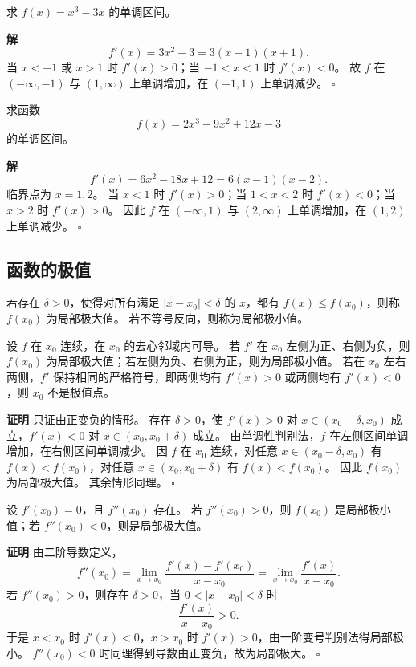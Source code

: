 \documentclass[fontset=fandol]{ctexart}
\newenvironment{proofdetail}{\par\noindent\textbf{证明}\quad}{\hfill$\square$\par\vspace{0.8em}}
\newenvironment{solution}{\par\noindent\textbf{解}\quad}{\hfill$\square$\par\vspace{0.8em}}
\begin{document}
\begin{example}[求单调区间]
求 $f(x)=x^3-3x$ 的单调区间。
\end{example}
\begin{solution}
\[
f'(x)=3x^2-3=3(x-1)(x+1).
\]
当 $x<-1$ 或 $x>1$ 时 $f'(x)>0$；当 $-1<x<1$ 时 $f'(x)<0$。 故 $f$ 在 $(-\infty,-1)$ 与 $(1,\infty)$ 上单调增加，在 $(-1,1)$ 上单调减少。
\end{solution}

\begin{example}[求单调区间]
求函数
\[
f(x)=2x^3-9x^2+12x-3
\]
的单调区间。
\end{example}
\begin{solution}
\[
f'(x)=6x^2-18x+12=6(x-1)(x-2).
\]
临界点为 $x=1,2$。 当 $x<1$ 时 $f'(x)>0$；当 $1<x<2$ 时 $f'(x)<0$；当 $x>2$ 时 $f'(x)>0$。 因此 $f$ 在 $(-\infty,1)$ 与 $(2,\infty)$ 上单调增加，在 $(1,2)$ 上单调减少。
\end{solution}

\subsection{函数的极值}

\begin{definition}[局部极值]
若存在 $\delta>0$，使得对所有满足 $|x-x_0|<\delta$ 的 $x$，都有 $f(x)\leq f(x_0)$，则称 $f(x_0)$ 为局部极大值。 若不等号反向，则称为局部极小值。
\end{definition}

\begin{theorem}[一阶导数变号判别法]
设 $f$ 在 $x_0$ 连续，在 $x_0$ 的去心邻域内可导。 若 $f'$ 在 $x_0$ 左侧为正、右侧为负，则 $f(x_0)$ 为局部极大值；若左侧为负、右侧为正，则为局部极小值。 若在 $x_0$ 左右两侧，$f'$ 保持相同的严格符号，即两侧均有 $f'(x)>0$ 或两侧均有 $f'(x)<0$，则 $x_0$ 不是极值点。
\end{theorem}
\begin{proofdetail}
只证由正变负的情形。 存在 $\delta>0$，使 $f'(x)>0$ 对 $x\in(x_0-\delta,x_0)$ 成立，$f'(x)<0$ 对 $x\in(x_0,x_0+\delta)$ 成立。 由单调性判别法，$f$ 在左侧区间单调增加，在右侧区间单调减少。 因 $f$ 在 $x_0$ 连续，对任意 $x\in(x_0-\delta,x_0)$ 有 $f(x)<f(x_0)$，对任意 $x\in(x_0,x_0+\delta)$ 有 $f(x)<f(x_0)$。 因此 $f(x_0)$ 为局部极大值。 其余情形同理。
\end{proofdetail}

\begin{theorem}[二阶导数判别法]
设 $f'(x_0)=0$，且 $f''(x_0)$ 存在。 若 $f''(x_0)>0$，则 $f(x_0)$ 是局部极小值；若 $f''(x_0)<0$，则是局部极大值。
\end{theorem}
\begin{proofdetail}
由二阶导数定义，
\[
f''(x_0)=\lim_{x\to x_0}\frac{f'(x)-f'(x_0)}{x-x_0}
=\lim_{x\to x_0}\frac{f'(x)}{x-x_0}.
\]
若 $f''(x_0)>0$，则存在 $\delta>0$，当 $0<|x-x_0|<\delta$ 时
\[
\frac{f'(x)}{x-x_0}>0.
\]
于是 $x<x_0$ 时 $f'(x)<0$，$x>x_0$ 时 $f'(x)>0$，由一阶变号判别法得局部极小。 $f''(x_0)<0$ 时同理得到导数由正变负，故为局部极大。
\end{proofdetail}
\end{document}
